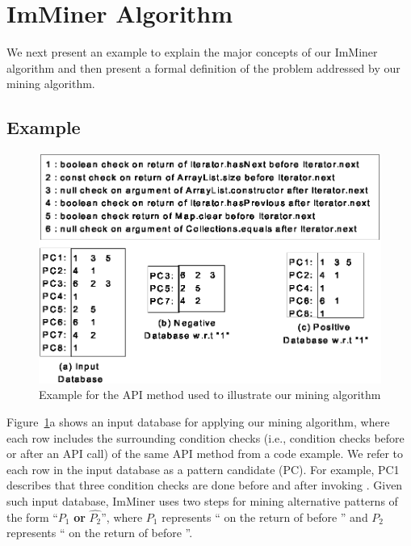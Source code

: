 \section{ImMiner Algorithm}
\label{sec:imminer}

We next present an example to explain the major concepts of our ImMiner algorithm and then present a formal definition of the problem addressed by our mining algorithm.

\subsection{Example}

\begin{figure}[t]
\centering
\includegraphics[scale=0.75,clip]{figs/miningex1.eps}\vspace*{-1ex}
\caption{Example for the  API method used to illustrate our mining algorithm} \label{fig:miningex}
\vspace*{-3ex}
\end{figure}

Figure~\ref{fig:miningex}a shows an input database for applying our mining algorithm, where each row includes the surrounding condition checks (i.e., condition checks before or after an API call) of the same API method from a code example. We refer to each row in the input database as a pattern candidate (PC). For example, PC1 describes that three condition checks are done before and after invoking . Given such input database, ImMiner uses two steps for mining alternative patterns of the form ``$P_1$ \textbf{or} $\hat{P_2}$'', where $P_1$ represents `` on the return of  before '' and $P_2$ represents `` on the return of  before ''.

